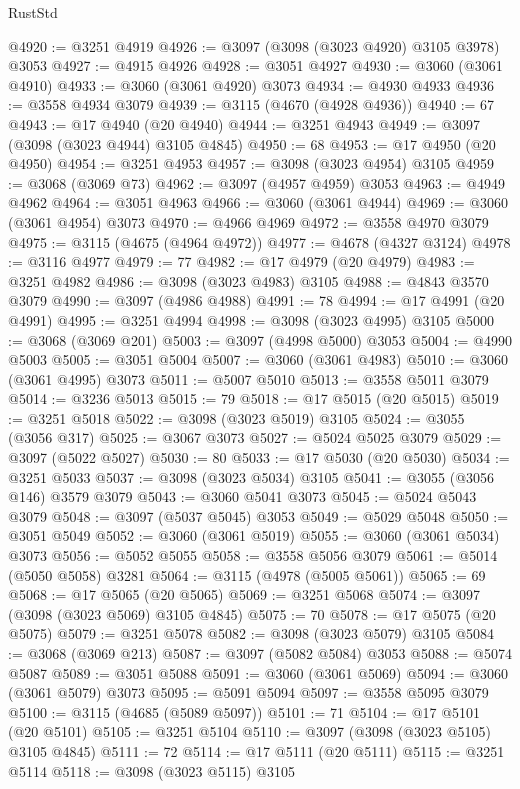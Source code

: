 \begin{lexlean}{RustStd}
\begin{coremodule}
@4920 := @3251 @4919
@4926 := @3097 (@3098 (@3023 @4920) @3105 @3978) @3053
@4927 := @4915 @4926
@4928 := @3051 @4927
@4930 := @3060 (@3061 @4910)
@4933 := @3060 (@3061 @4920) @3073
@4934 := @4930 @4933
@4936 := @3558 @4934 @3079
@4939 := @3115 (@4670 (@4928 @4936))
@4940 := 67
@4943 := @17 @4940 (@20 @4940)
@4944 := @3251 @4943
@4949 := @3097 (@3098 (@3023 @4944) @3105 @4845)
@4950 := 68
@4953 := @17 @4950 (@20 @4950)
@4954 := @3251 @4953
@4957 := @3098 (@3023 @4954) @3105
@4959 := @3068 (@3069 @73)
@4962 := @3097 (@4957 @4959) @3053
@4963 := @4949 @4962
@4964 := @3051 @4963
@4966 := @3060 (@3061 @4944)
@4969 := @3060 (@3061 @4954) @3073
@4970 := @4966 @4969
@4972 := @3558 @4970 @3079
@4975 := @3115 (@4675 (@4964 @4972))
@4977 := @4678 (@4327 @3124)
@4978 := @3116 @4977
@4979 := 77
@4982 := @17 @4979 (@20 @4979)
@4983 := @3251 @4982
@4986 := @3098 (@3023 @4983) @3105
@4988 := @4843 @3570 @3079
@4990 := @3097 (@4986 @4988)
@4991 := 78
@4994 := @17 @4991 (@20 @4991)
@4995 := @3251 @4994
@4998 := @3098 (@3023 @4995) @3105
@5000 := @3068 (@3069 @201)
@5003 := @3097 (@4998 @5000) @3053
@5004 := @4990 @5003
@5005 := @3051 @5004
@5007 := @3060 (@3061 @4983)
@5010 := @3060 (@3061 @4995) @3073
@5011 := @5007 @5010
@5013 := @3558 @5011 @3079
@5014 := @3236 @5013
@5015 := 79
@5018 := @17 @5015 (@20 @5015)
@5019 := @3251 @5018
@5022 := @3098 (@3023 @5019) @3105
@5024 := @3055 (@3056 @317)
@5025 := @3067 @3073
@5027 := @5024 @5025 @3079
@5029 := @3097 (@5022 @5027)
@5030 := 80
@5033 := @17 @5030 (@20 @5030)
@5034 := @3251 @5033
@5037 := @3098 (@3023 @5034) @3105
@5041 := @3055 (@3056 @146) @3579 @3079
@5043 := @3060 @5041 @3073
@5045 := @5024 @5043 @3079
@5048 := @3097 (@5037 @5045) @3053
@5049 := @5029 @5048
@5050 := @3051 @5049
@5052 := @3060 (@3061 @5019)
@5055 := @3060 (@3061 @5034) @3073
@5056 := @5052 @5055
@5058 := @3558 @5056 @3079
@5061 := @5014 (@5050 @5058) @3281
@5064 := @3115 (@4978 (@5005 @5061))
@5065 := 69
@5068 := @17 @5065 (@20 @5065)
@5069 := @3251 @5068
@5074 := @3097 (@3098 (@3023 @5069) @3105 @4845)
@5075 := 70
@5078 := @17 @5075 (@20 @5075)
@5079 := @3251 @5078
@5082 := @3098 (@3023 @5079) @3105
@5084 := @3068 (@3069 @213)
@5087 := @3097 (@5082 @5084) @3053
@5088 := @5074 @5087
@5089 := @3051 @5088
@5091 := @3060 (@3061 @5069)
@5094 := @3060 (@3061 @5079) @3073
@5095 := @5091 @5094
@5097 := @3558 @5095 @3079
@5100 := @3115 (@4685 (@5089 @5097))
@5101 := 71
@5104 := @17 @5101 (@20 @5101)
@5105 := @3251 @5104
@5110 := @3097 (@3098 (@3023 @5105) @3105 @4845)
@5111 := 72
@5114 := @17 @5111 (@20 @5111)
@5115 := @3251 @5114
@5118 := @3098 (@3023 @5115) @3105

\end{coremodule}
\end{lexlean}
